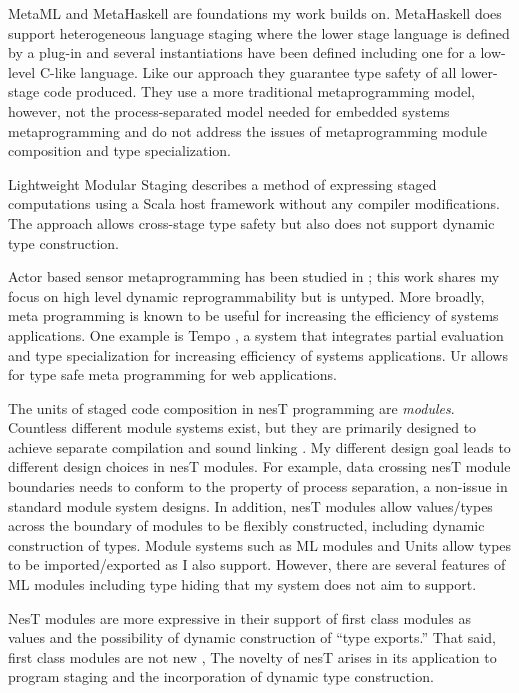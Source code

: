 MetaML \cite{Taha-MetaML,DBLP:conf/icess/Taha04} and MetaHaskell \cite{mainland12} are
foundations my work builds on. MetaHaskell does support heterogeneous language staging where the
lower stage language is defined by a plug-in and several instantiations have been defined
including one for a low-level C-like language. Like our approach they guarantee type safety of
all lower-stage code produced. They use a more traditional metaprogramming model, however, not
the process-separated model needed for embedded systems metaprogramming and do not address the
issues of metaprogramming module composition and type specialization.

Lightweight Modular Staging \cite{Rompf-LMS} describes a method of expressing staged
computations using a Scala host framework without any compiler modifications. The approach
allows cross-stage type safety but also does not support dynamic type construction.

Actor based sensor metaprogramming has been studied in \cite{cheong07}; this work shares my
focus on high level dynamic reprogrammability but is untyped. More broadly, meta programming is
known to be useful for increasing the efficiency of systems applications. One example is Tempo
\cite{289140}, a system that integrates partial evaluation and type specialization for
increasing efficiency of systems applications. Ur \cite{UrPLDI10} allows for type safe meta
programming for web applications.

The units of staged code composition in nesT programming are \emph{modules}. Countless different
module systems exist, but they are primarily designed to achieve separate compilation and sound
linking \cite{Cardelli-1997}. My different design goal leads to different design choices in nesT
modules. For example, data crossing nesT module boundaries needs to conform to the property of
process separation, a non-issue in standard module system designs. In addition, nesT modules
allow values/types across the boundary of modules to be flexibly constructed, including dynamic
construction of types. Module systems such as ML modules \cite{macqueen84} and Units
\cite{flatt98units} allow types to be imported/exported as I also support. However, there are
several features of ML modules including type hiding that my system does not aim to support.

NesT modules are more expressive in their support of first class modules as values and the
possibility of dynamic construction of ``type exports.'' That said, first class modules are not
new \cite{99620,ancona01calculus}, The novelty of nesT arises in its application to program
staging and the incorporation of dynamic type construction.

